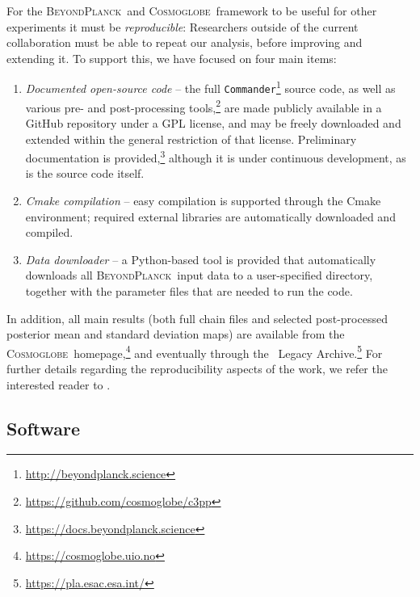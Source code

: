\documentclass[twocolumn]{aa}
\def\commander{\texttt{Commander}}
\newcommand{\BP}{\textsc{BeyondPlanck}}
\newcommand{\cosmoglobe}{\textsc{Cosmoglobe}}
\begin{document}
For the \BP\ and \cosmoglobe\ framework to be useful for other
experiments it must be \emph{reproducible}: Researchers outside of the
current collaboration must be able to repeat our analysis, before
improving and extending it. To support this, we have focused on four
main items:
\begin{enumerate}
\item \emph{Documented open-source code} -- the full
  \commander\footnote{\url{http://beyondplanck.science}} source code,
  as well as various pre- and post-processing
  tools,\footnote{\url{https://github.com/cosmoglobe/c3pp}} are made
  publicly available in a GitHub repository under a GPL license, and
  may be freely downloaded and extended within the general restriction
  of that license. Preliminary documentation is
  provided,\footnote{\url{https://docs.beyondplanck.science}} although
  it is under continuous development, as is the source code itself.
\item \emph{Cmake compilation} -- easy compilation is supported
  through the Cmake environment; required external libraries are
  automatically downloaded and compiled.
\item \emph{Data downloader} -- a Python-based tool is provided that
  automatically downloads all \BP\ input data to a user-specified
  directory, together with the parameter files that are needed to run
  the code.
\end{enumerate}
In addition, all main results (both full chain files and selected
post-processed posterior mean and standard deviation maps) are
available from the
\cosmoglobe\ homepage,\footnote{\url{https://cosmoglobe.uio.no}} and
eventually through the \Planck\ Legacy
Archive.\footnote{\url{https://pla.esac.esa.int/}} For further details
regarding the reproducibility aspects of the work, we refer the
interested reader to \citet{bp05}.

\subsection{Software}
\end{document}
